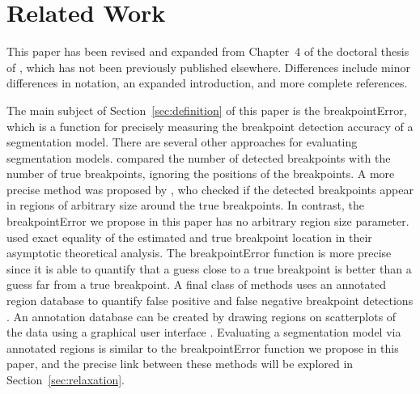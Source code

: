 \documentclass{jsfds} %
\begin{document}
\newpage

\section{Related Work}

This paper has been revised and expanded from Chapter~4 of the
doctoral thesis of \citet{HOCKING-phd-ch4}, which has not been
previously published elsewhere. Differences include minor differences
in notation, an expanded introduction, and more complete references.

The main subject of Section~\ref{sec:definition} of this paper is the
breakpointError, which is a function for precisely measuring the
breakpoint detection accuracy of a segmentation model. There are
several other approaches for evaluating segmentation
models. \citet{zaid-lasso} compared the number of detected breakpoints
with the number of true breakpoints, ignoring the positions of the
breakpoints. A more precise method was proposed by
\citet{perf-eval-framework}, who checked if the detected breakpoints
appear in regions of arbitrary size around the true breakpoints. In
contrast, the breakpointError we propose in this paper has no
arbitrary region size parameter. \citet{group-fused} used exact
equality of the estimated and true breakpoint location in their
asymptotic theoretical analysis. The breakpointError function is more
precise since it is able to quantify that a guess close to a true
breakpoint is better than a guess far from a true breakpoint. A final
class of methods uses an annotated region database to quantify false
positive and false negative breakpoint detections
\citep{HOCKING-breakpoints, HOCKING-penalties}. An annotation database
can be created by drawing regions on scatterplots of the data using a
graphical user interface \citep{SegAnnDB}. Evaluating a segmentation
model via annotated regions is similar to the breakpointError function
we propose in this paper, and the precise link between these methods
will be explored in Section~\ref{sec:relaxation}.
\end{document}
